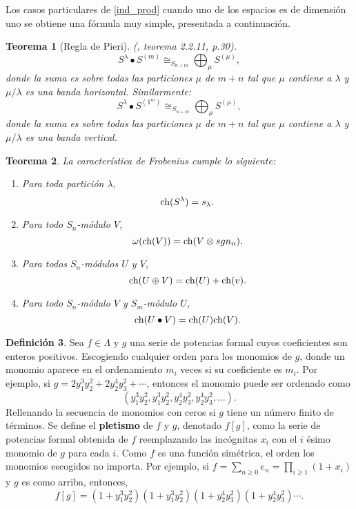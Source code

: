 \documentclass[12pt]{book}
\newtheorem{theorem}{Teorema}[section]
\theoremstyle{definition}
\newtheorem{definition}[theorem]{Definición}
\newcounter{in}
\newcounter{ini}
\begin{document}
Los casos particulares de \ref{ind_prod} cuando uno de los espacios es de dimensión uno se obtiene una fórmula muy simple, presentada a continuación.
\begin{theorem}[Regla de Pieri]{\normalfont(\cite{wachs2006poset}, teorema 2.2.11, p.30)}.
\label{pieri_rule}
$$S^{\lambda} \bullet S^{(m)} \cong_{S_{n + m}} \bigoplus_{\mu} S^{(\mu)},$$
donde la suma es sobre todas las particiones $\mu$ de $m + n$ tal que $\mu$ contiene a $\lambda$ y $\mu / \lambda$ es una banda horizontal. Similarmente:
$$S^{\lambda} \bullet S^{(1^{m})} \cong_{S_{n + m}} \bigoplus_{\mu} S^{(\mu)},$$
donde la suma es sobre todas las particiones $\mu$ de $m + n$ tal que $\mu$ contiene a $\lambda$ y $\mu / \lambda$ es una banda vertical.
\end{theorem}
\begin{theorem}
  \label{ch_f_pr}
  La característica de Frobenius cumple lo siguiente:
  \begin{enumerate}
  \item Para toda partición $\lambda$,
    $$\textup{ch}(S^{\lambda}) = s_{\lambda}.$$
  \item Para todo $S_n$-módulo $V$,
    $$ \omega(\textup{ch}(V)) = \textup{ch}(V \otimes sgn_n).$$
  \item Para todos $S_n$-módulos $U$ y $V$,
    $$\textup{ch}(U \oplus V) = \textup{ch}(U) + \textup{ch}(v).$$
  \item Para todo $S_n$-módulo $V$ y $S_m$-módulo $U$,
    $$\textup{ch}(U \bullet V) = \textup{ch}(U)\textup{ch}(V).$$
  \end{enumerate}
\end{theorem}
\begin{definition}
  \label{s_f_u}
  Sea $f \in \Lambda$ y $g$ una serie de potencias formal cuyos
  coeficientes son enteros positivos. Escogiendo cualquier orden para
  los monomios de $g$, donde un monomio aparece en el ordenamiento $m_{i}$ veces si su coeficiente es $m_{i}$. Por ejemplo, si
  $g=2y_{1}^{3}y_{2}^{2}+2y_{2}^{4}y_{3}^{2}+\cdots$, entonces el monomio puede ser
  ordenado como
  $$(y_{1}^{3}y_{2}^{2},y_{1}^{3}y_{2}^{2},y_{2}^{4}y_{3}^{2},y_{2}^{4}y_{3}^{2},\ldots).$$
Rellenando la secuencia de monomios con ceros si $g$ tiene un número
finito de términos. Se define el \textbf{pletismo} de $f$ y $g$,
denotado $f \left [ g \right ]$, como la serie de potencias formal
obtenida de $f$ reemplazando las incógnitas $x_{i}$ con el $i$ ésimo
monomio de $g$ para cada $i$. Como $f$ es una función simétrica, el
orden los monomios escogidos no importa. Por ejemplo, si
$f = \sum_{n \geq 0}e_n = \prod_{i \geq 1}(1 + x_{i})$ y $g$ es como
arriba, entonces,
\begin{equation}
  \label{eq:105}
  f \left [ g \right ] = (1 +y_{1}^{3}y_{2}^{2}) (1 +y_{1}^{3}y_{2}^{2}) (1 +y_{2}^{4}y_{3}^{2}) (1 +y_{2}^{4}y_{3}^{2}) \cdots .
\end{equation}
\end{definition}
\end{document}
